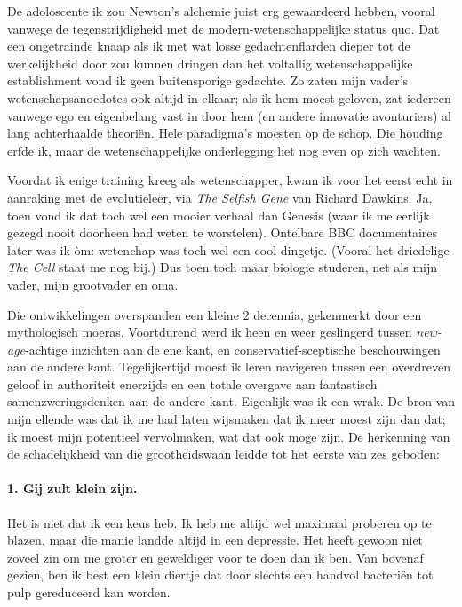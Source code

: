 \documentclass[12pt,a4paper]{article}
\begin{document}
De adoloscente ik zou Newton's alchemie juist erg gewaardeerd hebben, vooral vanwege de tegenstrijdigheid met de modern-wetenschappelijke status quo. Dat een ongetrainde knaap als ik met wat losse gedachtenflarden dieper tot de werkelijkheid door zou kunnen dringen dan het voltallig wetenschappelijke establishment vond ik geen buitensporige gedachte. Zo zaten mijn vader's wetenschapsanocdotes ook altijd in elkaar; als ik hem moest geloven, zat iedereen vanwege ego en eigenbelang vast in door hem (en andere innovatie avonturiers) al lang achterhaalde theoriën. Hele paradigma's moesten op de schop. Die houding erfde ik, maar de wetenschappelijke onderlegging liet nog even op zich wachten.

Voordat ik enige training kreeg als wetenschapper, kwam ik voor het eerst echt in aanraking met de evolutieleer, via \emph{The Selfish Gene} van Richard Dawkins. Ja, toen vond ik dat toch wel een mooier verhaal dan Genesis (waar ik me eerlijk gezegd nooit doorheen had weten te worstelen). Ontelbare BBC documentaires later was ik òm: wetenchap was toch wel een cool dingetje. (Vooral het driedelige \emph{The Cell} staat me nog bij.) Dus toen toch maar biologie studeren, net als mijn vader, mijn grootvader en oma.

Die ontwikkelingen overspanden een kleine 2 decennia, gekenmerkt door een mythologisch moeras. Voortdurend werd ik heen en weer geslingerd tussen \emph{new-age}-achtige inzichten aan de ene kant, en conservatief-sceptische beschouwingen aan de andere kant. Tegelijkertijd moest ik leren navigeren tussen een overdreven geloof in authoriteit enerzijds en een totale overgave aan fantastisch samenzweringsdenken aan de andere kant. Eigenlijk was ik een wrak. De bron van mijn ellende was dat ik me had laten wijsmaken dat ik meer moest zijn dan dat; ik moest mijn potentieel vervolmaken, wat dat ook moge zijn. De herkenning van de schadelijkheid van die grootheidswaan leidde tot het eerste van zes geboden:

\paragraph{1. Gij zult klein zijn.} Het is niet dat ik een keus heb. Ik heb me altijd wel maximaal proberen op te blazen, maar die manie landde altijd in een depressie. Het heeft gewoon niet zoveel zin om me groter en geweldiger voor te doen dan ik ben. Van bovenaf gezien, ben ik best een klein diertje dat door slechts een handvol bacteriën tot pulp gereduceerd kan worden.
\end{document}
